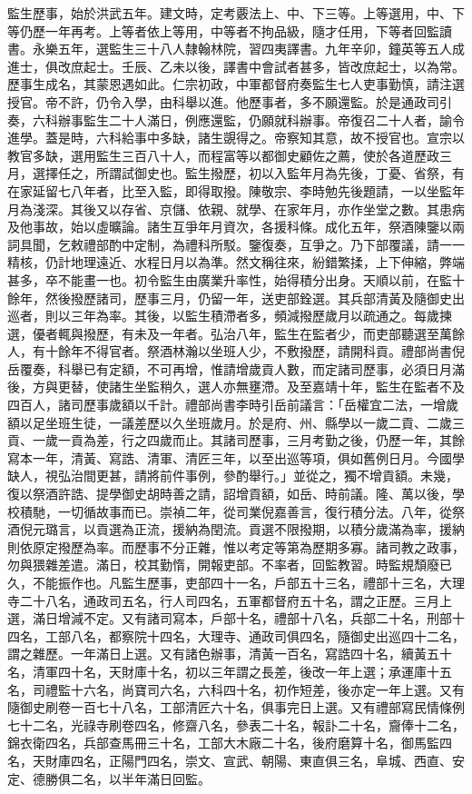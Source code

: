 監生歷事，始於洪武五年。建文時，定考覈法上、中、下三等。上等選用，中、下等仍歷一年再考。上等者依上等用，中等者不拘品級，隨才任用，下等者回監讀書。永樂五年，選監生三十八人隸翰林院，習四夷譯書。九年辛卯，鐘英等五人成進士，俱改庶起士。壬辰、乙未以後，譯書中會試者甚多，皆改庶起士，以為常。歷事生成名，其蒙恩遇如此。仁宗初政，中軍都督府奏監生七人吏事勤慎，請注選授官。帝不許，仍令入學，由科舉以進。他歷事者，多不願還監。於是通政司引奏，六科辦事監生二十人滿日，例應還監，仍願就科辦事。帝復召二十人者，諭令進學。蓋是時，六科給事中多缺，諸生覬得之。帝察知其意，故不授官也。宣宗以教官多缺，選用監生三百八十人，而程富等以都御史顧佐之薦，使於各道歷政三月，選擇任之，所謂試御史也。監生撥歷，初以入監年月為先後，丁憂、省祭，有在家延留七八年者，比至入監，即得取撥。陳敬宗、李時勉先後題請，一以坐監年月為淺深。其後又以存省、京儲、依親、就學、在家年月，亦作坐堂之數。其患病及他事故，始以虛曠論。諸生互爭年月資次，各援科條。成化五年，祭酒陳鑒以兩詞具聞，乞敕禮部酌中定制，為禮科所駁。鑒復奏，互爭之。乃下部覆議，請一一精核，仍計地理遠近、水程日月以為準。然文稱往來，紛錯繁揉，上下伸縮，弊端甚多，卒不能畫一也。初令監生由廣業升率性，始得積分出身。天順以前，在監十餘年，然後撥歷諸司，歷事三月，仍留一年，送吏部銓選。其兵部清黃及隨御史出巡者，則以三年為率。其後，以監生積滯者多，頻減撥歷歲月以疏通之。每歲揀選，優者輒與撥歷，有未及一年者。弘治八年，監生在監者少，而吏部聽選至萬餘人，有十餘年不得官者。祭酒林瀚以坐班人少，不敷撥歷，請開科貢。禮部尚書倪岳覆奏，科舉已有定額，不可再增，惟請增歲貢人數，而定諸司歷事，必須日月滿後，方與更替，使諸生坐監稍久，選人亦無壅滯。及至嘉靖十年，監生在監者不及四百人，諸司歷事歲額以千計。禮部尚書李時引岳前議言：「岳權宜二法，一增歲額以足坐班生徒，一議差歷以久坐班歲月。於是府、州、縣學以一歲二貢、二歲三貢、一歲一貢為差，行之四歲而止。其諸司歷事，三月考勤之後，仍歷一年，其餘寫本一年，清黃、寫誥、清軍、清匠三年，以至出巡等項，俱如舊例日月。今國學缺人，視弘治間更甚，請將前件事例，參酌舉行。」並從之，獨不增貢額。未幾，復以祭酒許誥、提學御史胡時善之請，詔增貢額，如岳、時前議。隆、萬以後，學校積馳，一切循故事而已。崇禎二年，從司業倪嘉善言，復行積分法。八年，從祭酒倪元璐言，以貢選為正流，援納為閏流。貢選不限撥期，以積分歲滿為率，援納則依原定撥歷為率。而歷事不分正雜，惟以考定等第為歷期多寡。諸司教之政事，勿與猥雜差遣。滿日，校其勤惰，開報吏部。不率者，回監教習。時監規頹廢已久，不能振作也。凡監生歷事，吏部四十一名，戶部五十三名，禮部十三名，大理寺二十八名，通政司五名，行人司四名，五軍都督府五十名，謂之正歷。三月上選，滿日增減不定。又有諸司寫本，戶部十名，禮部十八名，兵部二十名，刑部十四名，工部八名，都察院十四名，大理寺、通政司俱四名，隨御史出巡四十二名，謂之雜歷。一年滿日上選。又有諸色辦事，清黃一百名，寫誥四十名，續黃五十名，清軍四十名，天財庫十名，初以三年謂之長差，後改一年上選；承運庫十五名，司禮監十六名，尚寶司六名，六科四十名，初作短差，後亦定一年上選。又有隨御史刷卷一百七十八名，工部清匠六十名，俱事完日上選。又有禮部寫民情條例七十二名，光祿寺刷卷四名，修齋八名，參表二十名，報訃二十名，齎俸十二名，錦衣衛四名，兵部查馬冊三十名，工部大木廠二十名，後府磨算十名，御馬監四名，天財庫四名，正陽門四名，崇文、宣武、朝陽、東直俱三名，阜城、西直、安定、德勝俱二名，以半年滿日回監。

